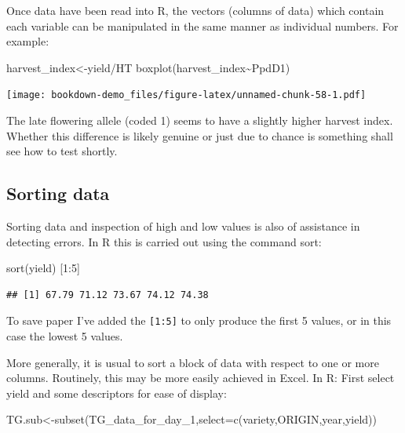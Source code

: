 \documentclass[
]{book}
\newenvironment{Shaded}{\begin{snugshade}}{\end{snugshade}}
\newcommand{\AttributeTok}[1]{\textcolor[rgb]{0.77,0.63,0.00}{#1}}
\newcommand{\DecValTok}[1]{\textcolor[rgb]{0.00,0.00,0.81}{#1}}
\newcommand{\FunctionTok}[1]{\textcolor[rgb]{0.00,0.00,0.00}{#1}}
\newcommand{\NormalTok}[1]{#1}
\newcommand{\OtherTok}[1]{\textcolor[rgb]{0.56,0.35,0.01}{#1}}
\newcommand{\SpecialCharTok}[1]{\textcolor[rgb]{0.00,0.00,0.00}{#1}}
\begin{document}
Once data have been read into R, the vectors (columns of data) which contain each variable can be manipulated in the same manner as individual numbers. For example:

\begin{Shaded}
\begin{Highlighting}[]
\NormalTok{harvest\_index}\OtherTok{\textless{}{-}}\NormalTok{yield}\SpecialCharTok{/}\NormalTok{HT}
\FunctionTok{boxplot}\NormalTok{(harvest\_index}\SpecialCharTok{\textasciitilde{}}\NormalTok{PpdD1)}
\end{Highlighting}
\end{Shaded}

\texttt{[image: bookdown-demo\_files/figure-latex/unnamed-chunk-58-1.pdf]}

The late flowering allele (coded 1) seems to have a slightly higher harvest index. Whether this difference is likely genuine or just due to chance is something shall see how to test shortly.

\hypertarget{sorting-data}{%
\subsection{Sorting data}\label{sorting-data}}

Sorting data and inspection of high and low values is also of assistance in detecting errors. In R this is carried out using the command sort:

\begin{Shaded}
\begin{Highlighting}[]
\FunctionTok{sort}\NormalTok{(yield) [}\DecValTok{1}\SpecialCharTok{:}\DecValTok{5}\NormalTok{]}
\end{Highlighting}
\end{Shaded}

\begin{verbatim}
## [1] 67.79 71.12 73.67 74.12 74.38
\end{verbatim}

To save paper I've added the \texttt{{[}1:5{]}} to only produce the first 5 values, or in this case the lowest 5 values.

More generally, it is usual to sort a block of data with respect to one or more columns. Routinely, this may be more easily achieved in Excel. In R: First select yield and some descriptors for ease of display:

\begin{Shaded}
\begin{Highlighting}[]
\NormalTok{TG.sub}\OtherTok{\textless{}{-}}\FunctionTok{subset}\NormalTok{(TG\_data\_for\_day\_1,}\AttributeTok{select=}\FunctionTok{c}\NormalTok{(variety,ORIGIN,year,yield))}
\end{Highlighting}
\end{Shaded}
\end{document}
